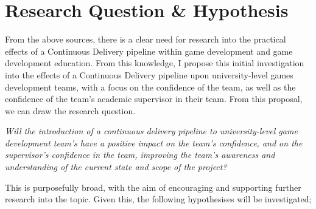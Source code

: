 \documentclass[journal]{IEEEtran}
\begin{document}

\section{Research Question \& Hypothesis}
From the above sources, there is a clear need for research into the practical effects of a Continuous Delivery pipeline within game development and game development education. From this knowledge, I propose this initial investigation into the effects of a Continuous Delivery pipeline upon university-level games development teams, with a focus on the confidence of the team, as well as the confidence of the team's academic supervisor in their team.
From this proposal, we can draw the research question.

\textit{Will the introduction of a continuous delivery pipeline to university-level game development team's have a positive impact on the team's confidence, and on the supervisor's confidence in the team, improving the team's awareness and understanding of the current state and scope of the project?}

This is purposefully broad, with the aim of encouraging and supporting further research into the topic. Given this, the following hypothesises will be investigated;
\end{document}
